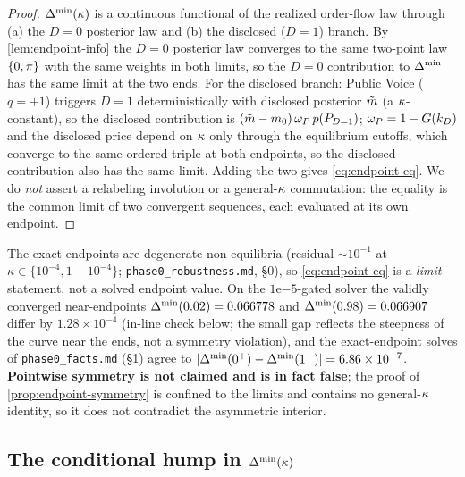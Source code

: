\begin{proof}
$\Delta^{\min}(\kappa)$ is a continuous functional of the realized order-flow law through
(a) the $D=0$ posterior law and (b) the disclosed ($D=1$) branch. By
\ref{lem:endpoint-info} the $D=0$ posterior law converges to the same two-point
law $\{0,\bar{\pi}\}$ with the same weights in both limits, so the $D=0$
contribution to $\Delta^{\min}$ has the same limit at the two ends. For the disclosed
branch: Public Voice ($q=+1$) triggers $D=1$ deterministically with disclosed
posterior $\tilde{m}$ (a $\kappa$-constant), so the disclosed contribution is
$(\tilde{m}-m_0)\,\omega_P\,p(P_{D=1})$; $\omega_P=1-G(k_D)$ and the disclosed price
depend on $\kappa$ only through the equilibrium cutoffs, which converge to the same
ordered triple at both endpoints, so the disclosed contribution also has the same
limit. Adding the two gives \eqref{eq:endpoint-eq}. We do \emph{not} assert a
relabeling involution or a general-$\kappa$ commutation: the equality is the common
limit of two convergent sequences, each evaluated at its own endpoint.
\end{proof}

\begin{remark}
\label{rem:endpoint-honest}
The exact endpoints are degenerate non-equilibria (residual $\sim10^{-1}$ at
$\kappa\in\{10^{-4},1-10^{-4}\}$; \texttt{phase0\_robustness.md}, \S0), so
\eqref{eq:endpoint-eq} is a \emph{limit} statement, not a solved endpoint value.
On the $1\mathrm{e}{-5}$-gated solver the validly converged near-endpoints
$\Delta^{\min}(0.02)=0.066778$ and $\Delta^{\min}(0.98)=0.066907$ differ by $1.28\times10^{-4}$
(in-line check below; the small gap reflects the steepness of the curve near the
ends, not a symmetry violation), and the exact-endpoint solves of
\texttt{phase0\_facts.md} (\S1) agree to
$|\Delta^{\min}(0^+)-\Delta^{\min}(1^-)|=6.86\times10^{-7}$. \textbf{Pointwise symmetry is not
claimed and is in fact false}; the proof of \ref{prop:endpoint-symmetry} is
confined to the limits and contains no general-$\kappa$ identity, so it does not
contradict the asymmetric interior.
\end{remark}

\subsection{The conditional hump in \texorpdfstring{$\Delta^{\min}(\kappa)$}{Delta-min(kappa)}}


